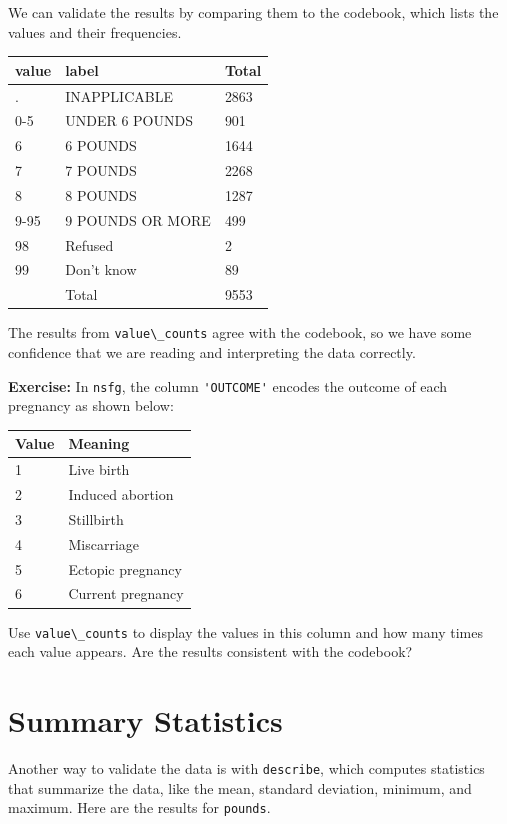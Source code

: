 We can validate the results by comparing them to the codebook, which
lists the values and their frequencies.

\begin{longtable}[]{@{}lll@{}}
\midrule()
value & label & Total \\
\midrule()
\endhead
. & INAPPLICABLE & 2863 \\
0-5 & UNDER 6 POUNDS & 901 \\
6 & 6 POUNDS & 1644 \\
7 & 7 POUNDS & 2268 \\
8 & 8 POUNDS & 1287 \\
9-95 & 9 POUNDS OR MORE & 499 \\
98 & Refused & 2 \\
99 & Don't know & 89 \\
& Total & 9553 \\
\midrule()
\end{longtable}

The results from \passthrough{\lstinline!value\_counts!} agree with the
codebook, so we have some confidence that we are reading and
interpreting the data correctly.

\textbf{Exercise:} In \passthrough{\lstinline!nsfg!}, the column
\passthrough{\lstinline!'OUTCOME'!} encodes the outcome of each
pregnancy as shown below:

\begin{longtable}[]{@{}ll@{}}
\midrule()
Value & Meaning \\
\midrule()
\endhead
1 & Live birth \\
2 & Induced abortion \\
3 & Stillbirth \\
4 & Miscarriage \\
5 & Ectopic pregnancy \\
6 & Current pregnancy \\
\midrule()
\end{longtable}

Use \passthrough{\lstinline!value\_counts!} to display the values in
this column and how many times each value appears. Are the results
consistent with the codebook?

\hypertarget{summary-statistics}{%
\section{Summary Statistics}\label{summary-statistics}}

Another way to validate the data is with
\passthrough{\lstinline!describe!}, which computes statistics that
summarize the data, like the mean, standard deviation, minimum, and
maximum. Here are the results for \passthrough{\lstinline!pounds!}.

